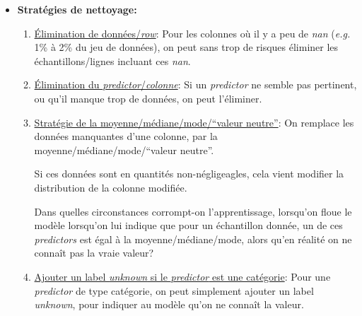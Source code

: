 \documentclass{article}
\begin{document}
\begin{enumerate}
\begin{itemize}[itemsep=1em]
    Il est donc très important de comprendre en quoi cette stratégie de
    nettoyage de données affecte le processus d'apprentissage. Comment
    peut-elle biaiser les résultats?

    Par exemples:
    \begin{itemize}
    \item Est-ce que la distribution des échantillons ayant des donn\'ees
      manquantes sera la m\^eme dans le futur?
    \item Est-ce qu'une donnée manquante est une information pertinente en soi?

      Exemple: Dans le jeu de données du Titanic, il semble que le fait qu'un
      passager n'ait pas de num\'ero de cabine (\emph{nan}), pourrait indiquer
      qu'il n'ait pas de cabine qui lui ait \'et\'e attribu\'ee ou r\'eserv\'ee.
      cabine. Peu importe la raison, la donnée manquante a une certaine valeur
      pr\'edictive en soi.
    \end{itemize}

  \item \textbf{Strat\'egies de nettoyage:}
    \begin{enumerate}
    \item \underline{\'Elimination de données/\emph{row}}: Pour les colonnes où il y a peu
      de \emph{nan} (\emph{e.g.} 1\% \`a 2\% du jeu de données), on peut
      sans trop de risques éliminer les \'echantillons/lignes incluant ces \emph{nan}.

    \item \underline{\'Elimination du \emph{predictor}/\emph{colonne}}: Si un
      \emph{predictor} ne semble pas pertinent, ou qu'il manque trop de données,
      on peut l'éliminer.

    \item \underline{Strat\'egie de la moyenne/m\'ediane/mode/``valeur neutre''}: On remplace
      les données manquantes d'une colonne, par la
      moyenne/m\'ediane/mode/``valeur neutre''.

      Si ces données sont en quantit\'es non-n\'egligeagles, cela vient
      modifier la distribution de la colonne modifi\'ee.

      Dans quelles circonstances corrompt-on l'apprentissage, lorsqu'on floue le modèle
      lorsqu'on lui indique que pour un \'echantillon donnée, un de ces
      \emph{predictors} est égal à la moyenne/m\'ediane/mode, alors qu'en
      r\'ealit\'e on ne conna\^it pas la vraie valeur?

    \item \underline{Ajouter un label \emph{unknown} si le \emph{predictor} est
        une catégorie}: Pour une \emph{predictor} de type catégorie, on peut
      simplement ajouter un label \emph{unknown}, pour indiquer au modèle qu'on
      ne connaît la valeur.


\end{enumerate}
\end{itemize}
\end{enumerate}
\end{document}
